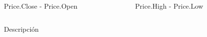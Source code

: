 \documentclass[final, xcolor=table]{beamer}\usepackage[]{graphicx}\usepackage[]{color}
\begin{document}
\begin{frame}
\begin{columns}[t]
\begin{column}{.24 \linewidth}
\begin{block}{\small {Price.Close - Price.Open}}

  \end{block}
  
\end{column}


\begin{column}{.24 \linewidth}

  \begin{block}{\small {Price.High - Price.Low}}


  \end{block}
  
\end{column}


\end{columns}


\begin{columns}[t]


\begin{column}{.32 \linewidth}

\begin{block}{\small Descripci\'on}
\end{block}
\end{column}



\end{columns}
\end{frame}
\end{document}
